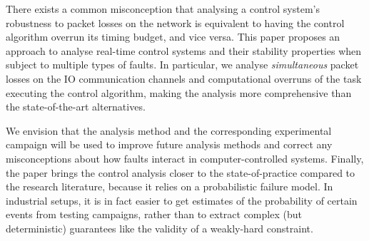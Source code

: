 There exists a common misconception that analysing a control system's robustness to packet losses on the network is equivalent to having the control algorithm overrun its timing budget, and vice versa.
This paper proposes an approach to analyse real-time control systems and their stability properties when subject to multiple types of faults.
In particular, we analyse \emph{simultaneous} packet losses on the IO communication channels and computational overruns of the task executing the control algorithm, making the analysis more comprehensive than the state-of-the-art alternatives.


We envision that the analysis method and the corresponding experimental campaign will be used to improve future analysis methods and correct any misconceptions about how faults interact in computer-controlled systems.
Finally, the paper brings the control analysis closer to the state-of-practice compared to the research literature, because it relies on a probabilistic failure model.
In industrial setups, it is in fact easier to get estimates of the probability of certain events from testing campaigns, rather than to extract complex (but deterministic) guarantees like the validity of a weakly-hard constraint.
